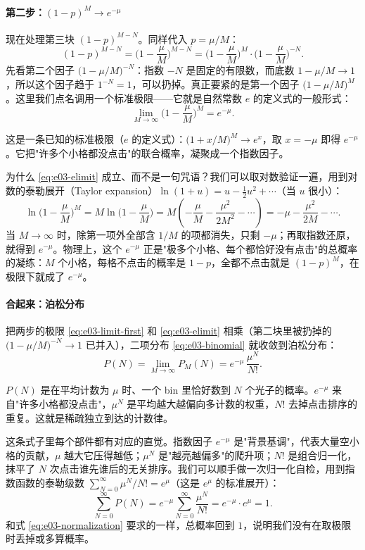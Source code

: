 \paragraph{\texorpdfstring{第二步：$(1-p)^{M}\to e^{-\mu}$}{第二步：不点击概率的极限}}

现在处理第三块 $(1-p)^{M-N}$。同样代入 $p=\mu/M$：
\[
  (1-p)^{M-N}=\Big(1-\frac{\mu}{M}\Big)^{M-N}
  =\Big(1-\frac{\mu}{M}\Big)^{M}\cdot\Big(1-\frac{\mu}{M}\Big)^{-N}.
\]
先看第二个因子 $\big(1-\mu/M\big)^{-N}$：指数 $-N$ 是固定的有限数，而底数 $1-\mu/M\to 1$，所以这个因子趋于 $1^{-N}=1$，可以扔掉。真正要紧的是第一个因子 $\big(1-\mu/M\big)^{M}$。这里我们点名调用一个标准极限——它就是自然常数 $e$ 的定义式的一般形式：
\begin{equation}
  \lim_{M\to\infty}\Big(1-\frac{\mu}{M}\Big)^{M}=e^{-\mu}.
  \label{eq:e03-elimit}
\end{equation}
\begin{formulaexplain}
这是一条已知的标准极限（$e$ 的定义式）：$\big(1+x/M\big)^{M}\to e^{x}$，取 $x=-\mu$ 即得 $e^{-\mu}$。它把"许多个小格都没点击"的联合概率，凝聚成一个指数因子。
\end{formulaexplain}
为什么 \eqref{eq:e03-elimit} 成立、而不是一句咒语？我们可以取对数验证一遍，用到对数的泰勒展开（Taylor expansion）$\ln(1+u)=u-\tfrac12u^{2}+\cdots$（当 $u$ 很小）：
\[
  \ln\Big(1-\frac{\mu}{M}\Big)^{M}
  =M\ln\Big(1-\frac{\mu}{M}\Big)
  =M\left(-\frac{\mu}{M}-\frac{\mu^{2}}{2M^{2}}-\cdots\right)
  =-\mu-\frac{\mu^{2}}{2M}-\cdots .
\]
当 $M\to\infty$ 时，除第一项外全部含 $1/M$ 的项都消失，只剩 $-\mu$；再取指数还原，就得到 $e^{-\mu}$。物理上，这个 $e^{-\mu}$ 正是"极多个小格、每个都恰好没有点击"的总概率的凝练：$M$ 个小格，每格不点击的概率是 $1-p$，全都不点击就是 $(1-p)^{M}$，在极限下就成了 $e^{-\mu}$。

\paragraph{合起来：泊松分布}

把两步的极限 \eqref{eq:e03-limit-first} 和 \eqref{eq:e03-elimit} 相乘（第二块里被扔掉的 $\big(1-\mu/M\big)^{-N}\to1$ 已并入），二项分布 \eqref{eq:e03-binomial} 就收敛到泊松分布：
\begin{equation}
  P(N)=\lim_{M\to\infty}P_M(N)
  =e^{-\mu}\,\frac{\mu^{N}}{N!}.
  \label{eq:e03-poisson}
\end{equation}
\begin{formulaexplain}
$P(N)$ 是在平均计数为 $\mu$ 时、一个 bin 里恰好数到 $N$ 个光子的概率。$e^{-\mu}$ 来自"许多小格都没点击"，$\mu^{N}$ 是平均越大越偏向多计数的权重，$N!$ 去掉点击排序的重复。这就是稀疏独立到达的计数律。
\end{formulaexplain}
这条式子里每个部件都有对应的直觉。指数因子 $e^{-\mu}$ 是"背景基调"，代表大量空小格的贡献，$\mu$ 越大它压得越低；$\mu^{N}$ 是"越亮越偏多"的爬升项；$N!$ 是组合归一化，抹平了 $N$ 次点击谁先谁后的无关排序。我们可以顺手做一次归一化自检，用到指数函数的泰勒级数 $\sum_{N=0}^{\infty}\mu^{N}/N!=e^{\mu}$（这是 $e^{\mu}$ 的标准展开）：
\[
  \sum_{N=0}^{\infty}P(N)
  =e^{-\mu}\sum_{N=0}^{\infty}\frac{\mu^{N}}{N!}
  =e^{-\mu}\cdot e^{\mu}=1 .
\]
和式 \eqref{eq:e03-normalization} 要求的一样，总概率回到 $1$，说明我们没有在取极限时丢掉或多算概率。


